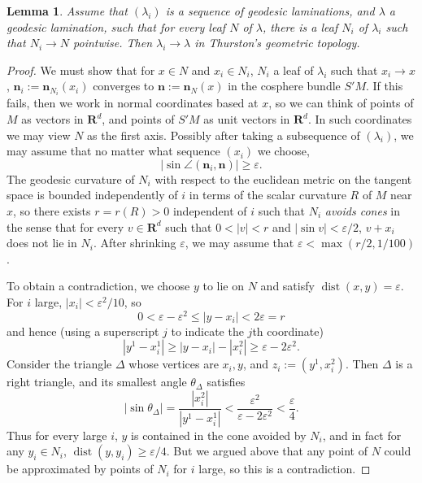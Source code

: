 \documentclass[reqno,11pt]{amsart}
\newcommand{\RR}{\mathbf{R}}
\DeclareMathOperator{\dist}{dist}
\newcommand{\normal}{\mathbf n}
\newcommand{\dfn}[1]{\emph{#1}\index{#1}}
\newtheorem{lemma}[theorem]{Lemma}
\theoremstyle{definition}
\numberwithin{equation}{section}
\begin{document}
\begin{lemma}\label{convergence of geodesic lams in thurston}
Assume that $(\lambda_i)$ is a sequence of geodesic laminations, and $\lambda$ a geodesic lamination, such that for every leaf $N$ of $\lambda$, there is a leaf $N_i$ of $\lambda_i$ such that $N_i \to N$ pointwise.
Then $\lambda_i \to \lambda$ in Thurston's geometric topology.
\end{lemma}
\begin{proof}
We must show that for $x \in N$ and $x_i \in N_i$, $N_i$ a leaf of $\lambda_i$ such that $x_i \to x$, $\normal_i := \normal_{N_i}(x_i)$ converges to $\normal := \normal_N(x)$ in the cosphere bundle $S'M$.
If this fails, then we work in normal coordinates based at $x$, so we can think of points of $M$ as vectors in $\RR^d$, and points of $S'M$ as unit vectors in $\RR^d$.
In such coordinates we may view $N$ as the first axis.
Possibly after taking a subsequence of $(\lambda_i)$, we may assume that no matter what sequence $(x_i)$ we choose,
$$|\sin \angle(\normal_i, \normal)| \geq \varepsilon.$$
The geodesic curvature of $N_i$ with respect to the euclidean metric on the tangent space is bounded independently of $i$ in terms of the scalar curvature $R$ of $M$ near $x$, so there exists $r = r(R) > 0$ independent of $i$ such that $N_i$ \dfn{avoids cones} in the sense that for every $v \in \RR^d$ such that $0 < |v| < r$ and $|\sin v| < \varepsilon/2$, $v + x_i$ does not lie in $N_i$.
After shrinking $\varepsilon$, we may assume that $\varepsilon < \max(r/2, 1/100)$.

To obtain a contradiction, we choose $y$ to lie on $N$ and satisfy $\dist(x, y) = \varepsilon$.
For $i$ large, $|x_i| < \varepsilon^2/10$, so
$$0 < \varepsilon - \varepsilon^2 \leq |y - x_i| < 2\varepsilon = r$$
and hence (using a superscript $j$ to indicate the $j$th coordinate)
$$|y^1 - x_i^1| \geq |y - x_i| - |x_i^2| \geq \varepsilon - 2\varepsilon^2.$$
Consider the triangle $\Delta$ whose vertices are $x_i, y$, and $z_i := (y^1, x_i^2)$.
Then $\Delta$ is a right triangle, and its smallest angle $\theta_\Delta$ satisfies
$$|\sin \theta_\Delta| = \frac{|x_i^2|}{|y^1 - x_i^1|} < \frac{\varepsilon^2}{\varepsilon - 2\varepsilon^2} < \frac{\varepsilon}{4}.$$
Thus for every large $i$, $y$ is contained in the cone avoided by $N_i$, and in fact for any $y_i \in N_i$, $\dist(y, y_i) \geq \varepsilon/4$.
But we argued above that any point of $N$ could be approximated by points of $N_i$ for $i$ large, so this is a contradiction.
\end{proof}
\end{document}
